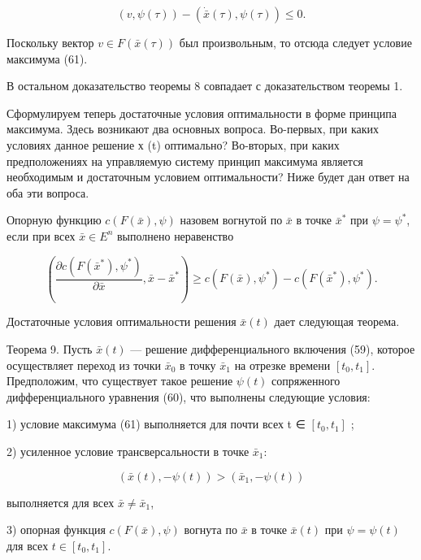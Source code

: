 \documentclass[10pt]{article}
\begin{document}
\[
\left( {v,\psi \left( \tau \right) }\right)  - \left( {\dot{\bar{x}}\left( \tau \right),\psi \left( \tau \right) }\right)  \leq  0.
\]

Поскольку вектор \(v \in  F\left( {\bar{x}\left( \tau \right) }\right)\) был произвольным, то отсюда следует условие максимума (61).

В остальном доказательство теоремы 8 совпадает с доказательством теоремы 1.

Сформулируем теперь достаточные условия оптимальности в форме принципа максимума. Здесь возникают два основных вопроса. Во-первых, при каких условиях данное решение х (t) оптимально? Во-вторых, при каких предположениях на управляемую систему принцип максимума является необходимым и достаточным условием оптимальности? Ниже будет дан ответ на оба эти вопроса.

Опорную функцию \(c\left( {F\left( \bar{x}\right),\psi }\right)\) назовем вогнутой по \(\bar{x}\) в точке \({\bar{x}}^{ * }\) при \(\psi = {\psi }^{ * }\), если при всех \(\bar{x} \in {E}^{n}\) выполнено неравенство

\[
\left( {\frac{\partial c\left( {F\left( {\bar{x}}^{ * }\right),{\psi }^{ * }}\right) }{\partial \bar{x}},\bar{x} - {\bar{x}}^{ * }}\right)  \geq  c\left( {F\left( \bar{x}\right),{\psi }^{ * }}\right)  - c\left( {F\left( {\bar{x}}^{ * }\right),{\psi }^{ * }}\right). \tag{64}
\]

Достаточные условия оптимальности решения \(\bar{x}\left( t\right)\) дает следующая теорема.

Теорема 9. Пусть \(\bar{x}\left( t\right)\) — решение дифференциального включения (59), которое осуществляет переход из точки \({\bar{x}}_{0}\) в точку \({\bar{x}}_{1}\) на отрезке времени \(\left\lbrack  {{t}_{0},{t}_{1}}\right\rbrack\). Предположим, что существует такое решение \(\psi \left( t\right)\) сопряженного дифференциального уравнения (60), что выполнены следующие условия:

1) условие максимума (61) выполняется для почти всех t ∈ \(\left\lbrack  {{t}_{0},{t}_{1}}\right\rbrack\) ;

2) усиленное условие трансверсальности в точке \({\bar{x}}_{1}\):

\[
\left( {\bar{x}\left( t\right), - \psi \left( t\right) }\right)  > \left( {{\bar{x}}_{1}, - \psi \left( t\right) }\right)
\]

выполняется для всех \(\bar{x} \neq  {\bar{x}}_{1}\),

3) опорная функция \(c\left( {F\left( \bar{x}\right),\psi }\right)\) вогнута по \(\bar{x}\) в точке \(\bar{x}\left( t\right)\) при \(\psi = \psi \left( t\right)\) для всех \(t \in \left\lbrack  {{t}_{0},{t}_{1}}\right\rbrack\).
\end{document}
